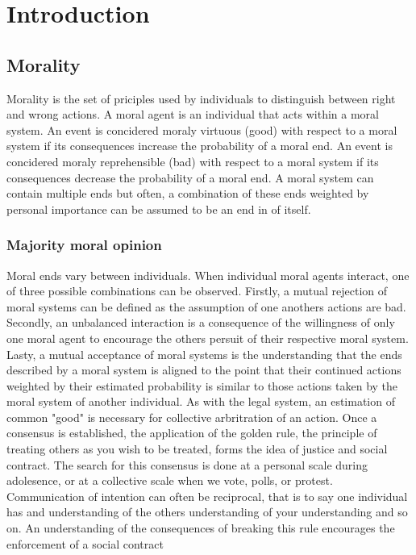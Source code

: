 \chapter{Introduction}
\section{Morality}
Morality is the set of priciples used by individuals to distinguish between right and wrong actions.
A moral agent is an individual that acts within a moral system.
An event is concidered moraly virtuous (good) with respect to a moral system if its consequences increase the probability of a moral end.
An event is concidered moraly reprehensible (bad) with respect to a moral system if its consequences decrease the probability of a moral end.
A moral system can contain multiple ends but often, a combination of these ends weighted by personal importance can be assumed to be an end in of itself.

\subsection{Majority moral opinion}
Moral ends vary between individuals.
When individual moral agents interact, one of three possible combinations can be observed.
Firstly, a mutual rejection of moral systems can be defined as the assumption of one anothers actions are bad. 
Secondly, an unbalanced interaction is a consequence of the willingness of only one moral agent to encourage the others persuit of their respective moral system.
Lasty, a mutual acceptance of moral systems is the understanding that the ends described by a moral system is aligned to the point that their continued actions weighted by their estimated probability is similar to those actions taken by the moral system of another individual.
As with the legal system, an estimation of common "good" is necessary for collective arbritration of an action.
Once a consensus is established, the application of the golden rule, the principle of treating others as you wish to be treated, forms the idea of justice and social contract.
The search for this consensus is done at a personal scale during adolesence, or at a collective scale when we vote, polls, or protest.
Communication of intention can often be reciprocal, that is to say one individual has and understanding of the others understanding of your understanding and so on.
An understanding of the consequences of breaking this rule encourages the enforcement of a social contract

